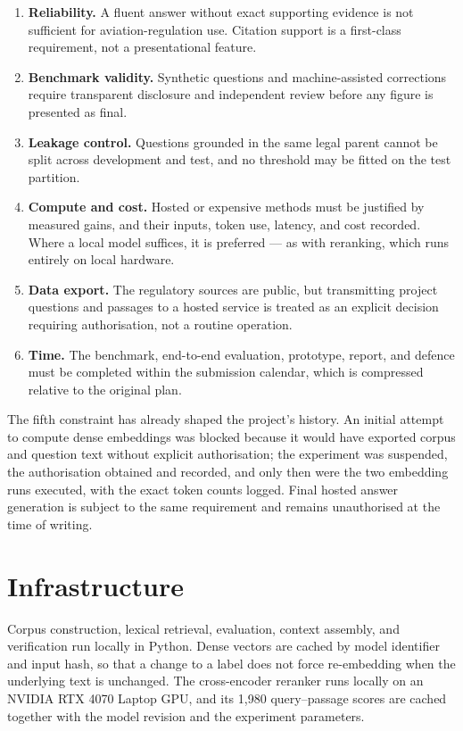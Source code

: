 \begin{enumerate}
  \item \textbf{Reliability.} A fluent answer without exact supporting evidence is not sufficient for aviation-regulation use. Citation support is a first-class requirement, not a presentational feature.
  \item \textbf{Benchmark validity.} Synthetic questions and machine-assisted corrections require transparent disclosure and independent review before any figure is presented as final.
  \item \textbf{Leakage control.} Questions grounded in the same legal parent cannot be split across development and test, and no threshold may be fitted on the test partition.
  \item \textbf{Compute and cost.} Hosted or expensive methods must be justified by measured gains, and their inputs, token use, latency, and cost recorded. Where a local model suffices, it is preferred --- as with reranking, which runs entirely on local hardware.
  \item \textbf{Data export.} The regulatory sources are public, but transmitting project questions and passages to a hosted service is treated as an explicit decision requiring authorisation, not a routine operation.
  \item \textbf{Time.} The benchmark, end-to-end evaluation, prototype, report, and defence must be completed within the submission calendar, which is compressed relative to the original plan.
\end{enumerate}

The fifth constraint has already shaped the project's history. An initial attempt to compute dense embeddings was blocked because it would have exported corpus and question text without explicit authorisation; the experiment was suspended, the authorisation obtained and recorded, and only then were the two embedding runs executed, with the exact token counts logged. Final hosted answer generation is subject to the same requirement and remains unauthorised at the time of writing.

\section{Infrastructure}
\label{sec:context-infra}

Corpus construction, lexical retrieval, evaluation, context assembly, and verification run locally in Python. Dense vectors are cached by model identifier and input hash, so that a change to a label does not force re-embedding when the underlying text is unchanged. The cross-encoder reranker runs locally on an NVIDIA RTX 4070 Laptop \ac{GPU}, and its 1{,}980 query--passage scores are cached together with the model revision and the experiment parameters.

